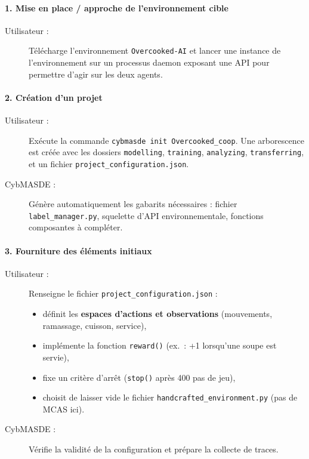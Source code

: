\paragraph{1. Mise en place / approche de l’environnement cible}
\begin{description}
  \item[Utilisateur :] Télécharge l’environnement \texttt{Overcooked-AI} et lancer une instance de l'environnement sur un processus daemon exposant une API pour permettre d'agir sur les deux agents.
\end{description}

\paragraph{2. Création d’un projet}
\begin{description}
  \item[Utilisateur :] Exécute la commande \texttt{cybmasde init Overcooked\_coop}.
    Une arborescence est créée avec les dossiers \texttt{modelling}, \texttt{training}, \texttt{analyzing}, \texttt{transferring}, et un fichier \texttt{project\_configuration.json}.
  \item[CybMASDE :] Génère automatiquement les gabarits nécessaires : fichier \texttt{label\_manager.py}, squelette d’API environnementale, fonctions composantes à compléter.
\end{description}

\paragraph{3. Fourniture des éléments initiaux}
\begin{description}
  \item[Utilisateur :] Renseigne le fichier \texttt{project\_configuration.json} :
    \begin{itemize}
      \item définit les \textbf{espaces d’actions et observations} (mouvements, ramassage, cuisson, service),
      \item implémente la fonction \texttt{reward()} (ex.~: +1 lorsqu’une soupe est servie),
      \item fixe un critère d’arrêt (\texttt{stop()} après 400 pas de jeu),
      \item choisit de laisser vide le fichier \texttt{handcrafted\_environment.py} (pas de MCAS ici).
    \end{itemize}
  \item[CybMASDE :] Vérifie la validité de la configuration et prépare la collecte de traces.
\end{description}

